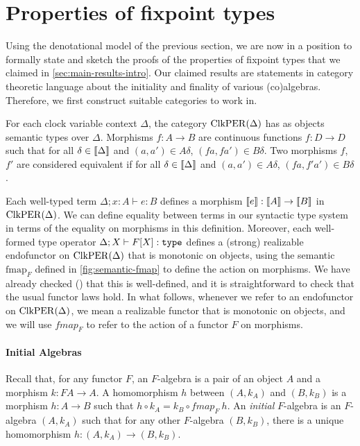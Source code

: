\section{Properties of fixpoint types}
\label{sec:fixpoint-types}

Using the denotational model of the previous section, we are now in a
position to formally state and sketch the proofs of the properties of
fixpoint types that we claimed in
\autoref{sec:main-results-intro}. Our claimed results are statements
in category theoretic language about the initiality and finality of
various (co)algebras. Therefore, we first construct suitable
categories to work in.

\begin{definition}
  For each clock variable context $\Delta$, the category
  $\mathrm{ClkPER}(\Delta)$ has as objects semantic types over
  $\Delta$. Morphisms $f : A \to B$ are continuous functions $f : D
  \to D$ such that for all $\delta \in \llbracket \Delta \rrbracket$ and $(a,a') \in
  A\delta$, $(fa, fa') \in B\delta$. Two morphisms $f$,$f'$ are
  considered equivalent if for all $\delta \in \llbracket \Delta \rrbracket$ and
  $(a,a') \in A\delta$, $(fa, f'a') \in B\delta$.
\end{definition}

Each well-typed term $\Delta; x : A \vdash e : B$ defines a morphism
$\llbracket e \rrbracket : \llbracket A \rrbracket \to \llbracket B \rrbracket$ in $\mathrm{ClkPER}(\Delta)$. We can define
equality between terms in our syntactic type system in terms of the
equality on morphisms in this definition. Moreover, each well-formed
type operator $\Delta; X \vdash F[X] : \texttt{\textup{type}}$ defines a (strong)
realizable endofunctor on $\mathrm{ClkPER}(\Delta)$ that is monotonic on
objects, using the semantic $\mathrm{fmap}_F$ defined in
\autoref{fig:semantic-fmap} to define the action on morphisms. We have
already checked () that this is
well-defined, and it is straightforward to check that the usual
functor laws hold. In what follows, whenever we refer to an
endofunctor on $\mathrm{ClkPER}(\Delta)$, we mean a realizable functor that is
monotonic on objects, and we will use $\mathit{fmap}_F$ to refer to
the action of a functor $F$ on morphisms.

\paragraph{Initial Algebras} Recall that, for any functor $F$, an
$F$-algebra is a pair of an object $A$ and a morphism $k : FA \to
A$. A homomorphism $h$ between $(A,k_A)$ and
$(B,k_B)$ is a morphism $h : A \to B$ such that $h \circ k_A = k_B
\circ \mathit{fmap}_F~h$. An \emph{initial} $F$-algebra is an
$F$-algebra $(A,k_A)$ such that for any other $F$-algebra $(B,k_B)$,
there is a unique homomorphism $h : (A,k_A) \to (B,k_B)$.


